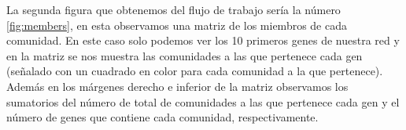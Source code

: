 \begin{minipage}{\linewidth}
	\label{fig:dendrogram}
\end{minipage}

La segunda figura que obtenemos del flujo de trabajo sería la número \ref{fig:members}, en esta observamos una matriz de los miembros de cada comunidad. En este caso solo podemos ver los 10 primeros genes de nuestra red y en la matriz se nos muestra las comunidades a las que pertenece cada gen (señalado con un cuadrado en color para cada comunidad a la que pertenece). Además en los márgenes derecho e inferior de la matriz observamos los sumatorios del número de total de comunidades a las que pertenece cada gen y el número de genes que contiene cada comunidad, respectivamente.

\begin{minipage}{\linewidth}
	\label{fig:members}
\end{minipage}

